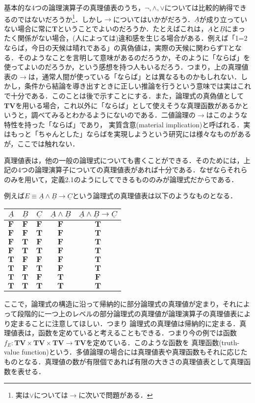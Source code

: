 \documentclass{ltjsarticle}
\theoremstyle{mystyle1}
\theoremstyle{mystyle2}
\newcommand{\uA}{\underline{A}}
\newcommand{\uB}{\underline{B}}
\newcommand{\uC}{\underline{C}}
\newcommand{\bT}{\ensuremath{\mathbf{T}}}
\newcommand{\bF}{\ensuremath{\mathbf{F}}}
\newcommand{\bV}{\ensuremath{\mathbf{V}}}
\newcommand{\red}[1]{{\color{red} #1}}
\begin{document}
基本的な4つの論理演算子の真理値表のうち，$\neg,\wedge,\vee$については比較的納得できるのではないだろうか\footnote{実は$\vee$については$\to$に次いで問題がある．}．しかし$\to$についてはいかがだろう．$\uA$が成り立っていない場合に常に$\bT$ということでよいのだろうか．たとえばこれは，$\uA$と$\uB$にまったく関係がない場合，(人によっては)違和感を生じる場合がある．例えば「1=2ならば，今日の天候は晴れである」の真偽値は，実際の天候に関わらずTとなる．そのようなことを言明して意味があるのだろうか，そのように「ならば」を使ってよいのだろうか，という感想を持つ人もいるだろう．つまり，上の真理値表の$\to$は，通常人間が使っている「ならば」とは異なるものかもしれない．しかし，条件から結論を導き出すときに正しい推論を行うという意味では実はこれで十分である．このことは後で示すことにする．また，論理式の真偽値として$\bT\bV$を用いる場合，これ以外に「ならば」として使えそうな真理函数があるかというと，調べてみるとわかるようにないのである．二値論理の$\to$はこのような特性を持った「ならば」であり，\red{実質含意}(material implication)と呼ばれる．実はもっと「ちゃんとした」ならばを実現しようという研究には様々なものがあるが，ここでは触れない．

真理値表は，他の一般の論理式についても書くことができる．そのためには，上記の4つの論理演算子についての真理値表があれば十分である．なぜならそれらのみを用いて，定義2.1のようにしてできるもののみが論理式だからである．

例えば$E\equiv\uA\wedge\uB\to\uC$という論理式の真理値表は以下のようなものとなる．
\begin{table}[h]
  \centering
  \begin{tabular}{|c|c|c||c|c|}\hline
    $\uA$ & $\uB$ & $\uC$ & $\uA\wedge\uB$ & $\uA\wedge\uB\to\uC$ \\\hline\hline
    $\bF$ & $\bF$ & $\bF$ & $\bF$          & $\bT$                \\\hline
    $\bF$ & $\bF$ & $\bT$ & $\bF$          & $\bT$                \\\hline
    $\bF$ & $\bT$ & $\bF$ & $\bF$          & $\bT$                \\\hline
    $\bF$ & $\bT$ & $\bT$ & $\bF$          & $\bT$                \\\hline
    $\bT$ & $\bF$ & $\bF$ & $\bF$          & $\bT$                \\\hline
    $\bT$ & $\bF$ & $\bT$ & $\bF$          & $\bT$                \\\hline
    $\bT$ & $\bT$ & $\bF$ & $\bT$          & $\bF$                \\\hline
    $\bT$ & $\bT$ & $\bT$ & $\bT$          & $\bT$                \\\hline
  \end{tabular}
\end{table}
ここで，論理式の構造に沿って帰納的に部分論理式の真理値が定まり，それによって段階的に一つ上のレベルの部分論理式の真理値が論理演算子の真理値表により定まることに注意してほしい．つまり\red{論理式の真理値は帰納的に定まる}．真理値表は，函数を定めていると考えることもできる．つまり今の例では函数$f_E:\bT\bV\times\bT\bV\times\bT\bV\to\bT\bV$を定めている．このような函数を\red{真理函数}(truth-value function)という．多値論理の場合には真理値表や真理函数もそれに応じたものとなる．真理値の数が有限個であれば有限の大きさの真理値表として真理函数を表せる．
\end{document}
